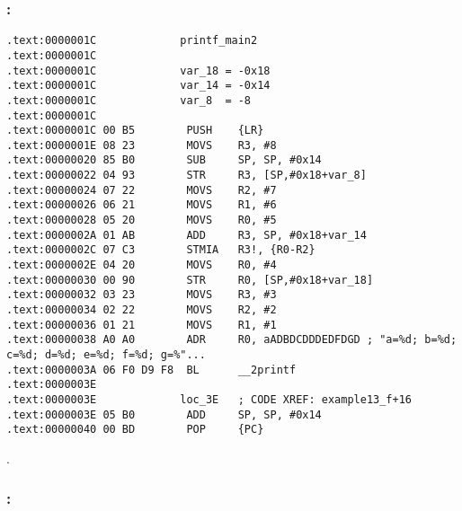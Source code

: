 \subsubsection{\OptimizingKeilVI: \ThumbMode}

\begin{lstlisting}
.text:0000001C             printf_main2
.text:0000001C
.text:0000001C             var_18 = -0x18
.text:0000001C             var_14 = -0x14
.text:0000001C             var_8  = -8
.text:0000001C
.text:0000001C 00 B5        PUSH    {LR}
.text:0000001E 08 23        MOVS    R3, #8
.text:00000020 85 B0        SUB     SP, SP, #0x14
.text:00000022 04 93        STR     R3, [SP,#0x18+var_8]
.text:00000024 07 22        MOVS    R2, #7
.text:00000026 06 21        MOVS    R1, #6
.text:00000028 05 20        MOVS    R0, #5
.text:0000002A 01 AB        ADD     R3, SP, #0x18+var_14
.text:0000002C 07 C3        STMIA   R3!, {R0-R2}
.text:0000002E 04 20        MOVS    R0, #4
.text:00000030 00 90        STR     R0, [SP,#0x18+var_18]
.text:00000032 03 23        MOVS    R3, #3
.text:00000034 02 22        MOVS    R2, #2
.text:00000036 01 21        MOVS    R1, #1
.text:00000038 A0 A0        ADR     R0, aADBDCDDDEDFDGD ; "a=%d; b=%d; c=%d; d=%d; e=%d; f=%d; g=%"...
.text:0000003A 06 F0 D9 F8  BL      __2printf
.text:0000003E
.text:0000003E             loc_3E   ; CODE XREF: example13_f+16
.text:0000003E 05 B0        ADD     SP, SP, #0x14
.text:00000040 00 BD        POP     {PC}
\end{lstlisting}

.

\subsubsection{\OptimizingXcodeIV: \ARMMode}


